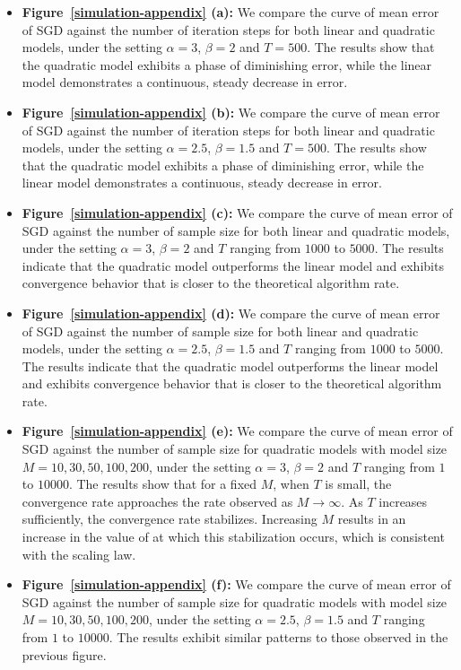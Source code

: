 \begin{itemize}
    \item \textbf{Figure~\ref{simulation-appendix} (a):} We compare the curve of mean error of SGD against the number of iteration steps for both linear and quadratic models, under the setting $\alpha=3$, $\beta=2$ and $T=500$.  The results show that the quadratic model exhibits a phase of diminishing error, while the linear model demonstrates a continuous, steady decrease in error.
    \item \textbf{Figure~\ref{simulation-appendix} (b):} We compare the curve of mean error of SGD against the number of iteration steps for both linear and quadratic models, under the setting $\alpha=2.5$, $\beta=1.5$ and $T=500$.  The results show that the quadratic model exhibits a phase of diminishing error, while the linear model demonstrates a continuous, steady decrease in error.
    \item \textbf{Figure~\ref{simulation-appendix} (c):} We compare the curve of mean error of SGD against the number of sample size for both linear and quadratic models, under the setting $\alpha=3$, $\beta=2$ and $T$ ranging from $1000$ to $5000$. The results indicate that the quadratic model outperforms the linear model and exhibits convergence behavior that is closer to the theoretical algorithm rate.
    \item \textbf{Figure~\ref{simulation-appendix} (d):} We compare the curve of mean error of SGD against the number of sample size for both linear and quadratic models, under the setting $\alpha=2.5$, $\beta=1.5$ and $T$ ranging from $1000$ to $5000$. The results indicate that the quadratic model outperforms the linear model and exhibits convergence behavior that is closer to the theoretical algorithm rate.
    \item \textbf{Figure~\ref{simulation-appendix} (e):} We compare the curve of mean error of SGD against the number of sample size for quadratic models with model size $M=10,30,50,100,200$, under the setting $\alpha=3$, $\beta=2$ and $T$ ranging from $1$ to $10000$. 
    The results show that for a fixed $M$, when $T$ is small, the convergence rate approaches the rate observed as $M\to \infty$. As $T$ increases sufficiently, the convergence rate stabilizes. Increasing $M$ results in an increase in the value of at which this stabilization occurs, which is consistent with the scaling law.
    \item \textbf{Figure~\ref{simulation-appendix} (f):} We compare the curve of mean error of SGD against the number of sample size for quadratic models with model size $M=10,30,50,100,200$, under the setting $\alpha=2.5$, $\beta=1.5$ and $T$ ranging from $1$ to $10000$. The results exhibit similar patterns to those observed in the previous figure.
\end{itemize}


